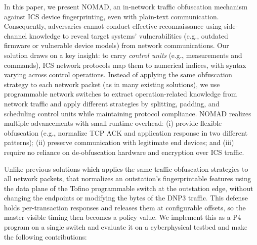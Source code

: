 \documentclass[conference]{IEEEtran}
\begin{document}
In this paper, we present NOMAD, an in-network traffic obfuscation mechanism against ICS device fingerprinting, even with plain-text communication. Consequently, adversaries cannot conduct effective reconnaissance using side-channel knowledge to reveal target systems' vulnerabilities (e.g., outdated firmware or vulnerable device models) from network communications. Our solution draws on a key insight: to carry \textit{control units} (e.g., measurements and commands), ICS network protocols map them to numerical indices, with syntax varying across control operations. %
Instead of applying the same obfuscation strategy to each network packet (as in many existing solutions), we use programmable network switches to extract operation-related knowledge from network traffic and apply different strategies by splitting, padding, and scheduling control units while maintaining protocol compliance. 
NOMAD realizes multiple advancements with small runtime overhead: (i) provide flexible obfuscation (e.g., normalize TCP ACK and application response in two different patterns); (ii) preserve communication with legitimate end devices; and (iii) require no reliance on de-obfuscation hardware and encryption over ICS traffic. 


Unlike previous solutions which applies the same traffic obfuscation strategies to all network packets, that normalizes an outstation's fingerprintable features using the data plane of the Tofino programmable switch at the outstation edge, without changing the endpoints or modifying the bytes of the  DNP3 traffic. This defense holds per-transaction responses and releases them at configurable offsets, so the master-visible timing then becomes a policy value. We implement  this as a P4 program on a single switch and evaluate it on a cyberphysical testbed and make the following contributions:
\end{document}
